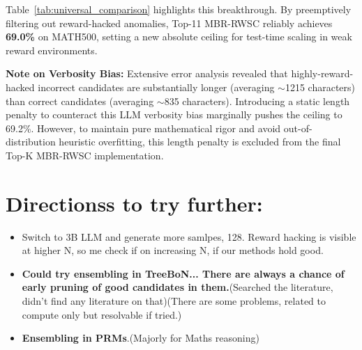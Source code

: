\documentclass[a4paper,11pt]{article}
\begin{document}
Table~\ref{tab:universal_comparison} highlights this breakthrough. By preemptively filtering out reward-hacked anomalies, Top-11 MBR-RWSC reliably achieves \textbf{69.0\%} on MATH500, setting a new absolute ceiling for test-time scaling in weak reward environments.

\textbf{Note on Verbosity Bias:} Extensive error analysis revealed that highly-reward-hacked incorrect candidates are substantially longer (averaging $\sim$1215 characters) than correct candidates (averaging $\sim$835 characters). Introducing a static length penalty to counteract this LLM verbosity bias marginally pushes the ceiling to 69.2\%. However, to maintain pure mathematical rigor and avoid out-of-distribution heuristic overfitting, this length penalty is excluded from the final Top-K MBR-RWSC implementation.



\section{Directionss to try further:}
\begin{itemize}
    \item Switch to 3B LLM and generate more samlpes, 128. Reward hacking is visible at higher N, so me check if on increasing N, if our methods hold good.
    \item \textbf{Could try ensembling in TreeBoN... There are always a chance of early pruning of good candidates in them.}(Searched the literature, didn't find any literature on that)(There are some problems, related to compute only but resolvable if tried.)
    \item \textbf{Ensembling in PRMs}.(Majorly for Maths reasoning)
    
\end{itemize}



\end{document}
